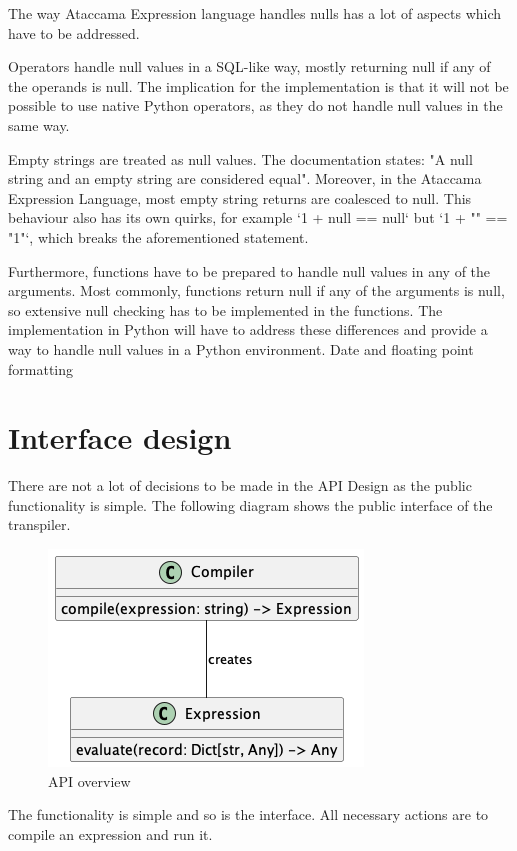 The way Ataccama Expression language handles nulls has a lot of aspects
which have to be addressed.

Operators handle null values in a SQL-like way, mostly returning null if any
of the operands is null. The implication for the implementation is that it will not be
possible to use native Python operators, as they do not handle null values in the
same way.

Empty strings are treated as null values. The documentation states: "A null
string and an empty string are considered equal". Moreover, in the Ataccama Expression Language, most empty string
returns are coalesced to null. This behaviour also has its own quirks, for example
‘1 + null == null‘ but ‘1 + "" == "1"‘, which breaks the aforementioned statement.

Furthermore, functions have to be prepared to handle null values in any of the
arguments. Most commonly, functions return null if any of the arguments is null,
so extensive null checking has to be implemented in the functions.
The implementation in Python will have to address these differences and
provide a way to handle null values in a Python environment.
Date and floating point formatting

\section{Interface design}

There are not a lot of decisions to be made in the API Design as the public
functionality is simple. The following diagram shows the public interface of the transpiler.

\begin{figure}[htbp]
    \centering
    \includegraphics[scale=0.7]{diagrams/api_design-class.png}
    \caption{API overview}
    \label{fig:api}
\end{figure}


The functionality is simple and so is the interface.  All necessary actions are to compile an expression and run it. 


